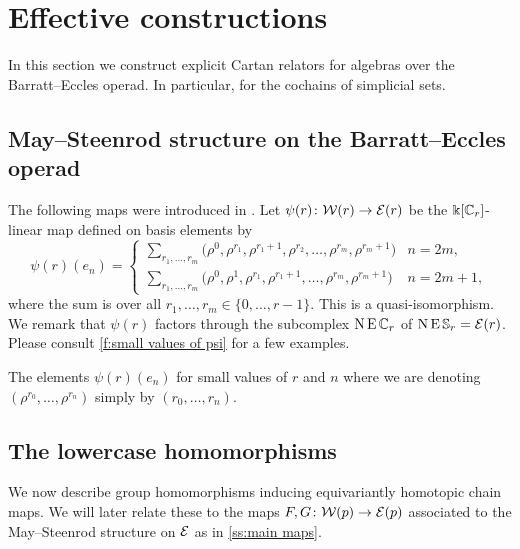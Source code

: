 
\section{Effective constructions}

In this section we construct explicit Cartan relators for algebras over the Barratt--Eccles operad.
In particular, for the cochains of simplicial sets.

\subsection{May--Steenrod structure on the Barratt--Eccles operad}

The following maps were introduced in \cite{medina2021may_st}.
Let $\psi(r) \colon \mathcal{W}(r) \to \mathcal{E}(r)$ be the $\Bbbk[\mathbb{C}_r]$-linear map defined on basis elements by
\begin{equation*}
	\psi(r)(e_{n}) = \begin{cases}
		\displaystyle{\sum_{r_1, \dots, r_m}} \big(\rho^0, \rho^{r_1}, \rho^{r_1+1}, \rho^{r_2}, \dots, \rho^{r_{m}}, \rho^{r_{m}+1} \big) & n = 2m, \\
		\displaystyle{\sum_{r_1, \dots, r_m}} \big(\rho^0, \rho^1, \rho^{r_1}, \rho^{r_1+1}, \dots, \rho^{r_{m}}, \rho^{r_{m}+1} \big) & n = 2m+1,
	\end{cases}
\end{equation*}
where the sum is over all $r_1, \dots, r_m \in \{0, \dots, r-1\}$.
This is a quasi-isomorphism.
We remark that $\psi(r)$ factors through the subcomplex $\operatorname{N}\operatorname{E}\mathbb{C}_r$ of $\operatorname{N}\operatorname{E}\mathbb{S}_r = \mathcal{E}(r)$.
Please consult \cref{f:small values of psi} for a few examples.

\begin{table}
	\centering
	
	\caption{The elements $\psi(r)(e_n)$ for small values of $r$ and $n$ where we are denoting $(\rho^{r_0}, \dots, \rho^{r_n})$ simply by $(r_0, \dots, r_n)$.}
	\label{f:small values of psi}
\end{table}

\subsection{The lowercase homomorphisms}

We now describe group homomorphisms inducing equivariantly homotopic chain maps.
We will later relate these to the maps $F,G \colon \mathcal{W}(p) \to \mathcal{E}(p)$ associated to the May--Steenrod structure on $\mathcal{E}$ as in \cref{ss:main maps}.

